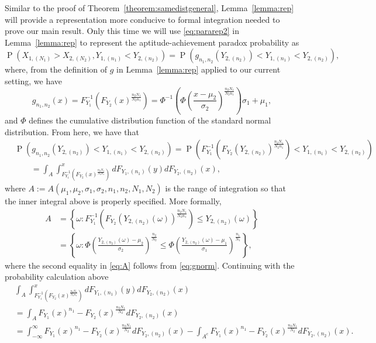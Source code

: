 \documentclass[12pt]{article}
\DeclareMathOperator*{\Prob}{P}
\begin{document}
Similar to the proof of Theorem~\ref{theorem:samedistgeneral}, Lemma~\ref{lemma:rep} will provide a representation more conducive to formal integration needed to prove our main result. Only this time we will use \eqref{eq:pararep2} in Lemma~\ref{lemma:rep} to represent the aptitude-achievement paradox probability as 
$$
 \Prob\left(X_{1,(N_1)} > X_{2,(N_2)}, Y_{1,(n_1)} < Y_{2,(n_2)}\right) = \Prob\left( g_{n_1,n_2}\left(Y_{2,(n_2)}\right) < Y_{1,(n_1)}  < Y_{2,(n_2)}\right),
$$
where, from the definition of $g$ in Lemma~\ref{lemma:rep} applied to our current setting, we have 
\begin{equation} \label{eq:gnorm}
	  g_{n_1, n_2}(x) = F_{Y_1}^{-1}\left(F_{Y_2}(x)^{\frac{n_2N_1}{N_2n_1}}\right) = \Phi^{-1}\left(\Phi\left(\frac{x-\mu_2}{\sigma_2}\right)^\frac{n_2N_1}{N_2n_1}\right)\sigma_1 +\mu_1,
\end{equation}
and $\Phi$ defines the cumulative distribution function of the standard normal distribution. From here, we have that
\begin{align*}
	&\Prob\left( g_{n_1,n_2}\left(Y_{2,(n_2)}\right) < Y_{1,(n_1)}  < Y_{2,(n_2)}\right) = \Prob\left( F_{Y_1}^{-1}\left(F_{Y_2}(Y_{2,(n_2)})^{\frac{n_2N_1}{N_2n_1}}\right) < Y_{1,(n_1)}  < Y_{2,(n_2)}\right)\\
	&\qquad= \int_{A} \int_{F_{Y_1}^{-1}\left(F_{Y_2}(x)^{\frac{n_2N_1}{N_2n_1}}\right)}^{x} d F_{Y_1, (n_1)}(y) d F_{Y_2, (n_2)}(x),
\end{align*}
where $A := A(\mu_1,\mu_2,\sigma_1,\sigma_2, n_1,n_2,N_1,N_2)$ is the range of integration so that the inner integral above is properly specified. More formally,
\begin{equation} \label{eq:A}
\begin{split}
	  A &= \left\{\omega: F_{Y_1}^{-1}\left(F_{Y_2}(Y_{2,(n_2)}(\omega))^{\frac{n_2N_1}{N_2n_1}}\right) \leq Y_{2,(n_2)}(\omega)\right\} \\
  &= \left\{\omega: \Phi\left(\frac{Y_{2,(n_2)}(\omega)-\mu_2}{\sigma_2}\right)^{\frac{n_2}{N_2}} \leq \Phi\left(\frac{Y_{2,(n_2)}(\omega) - \mu_1}{\sigma_1}\right)^{\frac{n_1}{N_1}}\right\},
\end{split}	
\end{equation}
where the second equality in \eqref{eq:A} follows from \eqref{eq:gnorm}. Continuing with the probability calculation above
\begin{align} \label{eq:paradecomp}
	&\int_{A} \int_{F_{Y_1}^{-1}\left(F_{Y_2}(x)^{\frac{n_2N_1}{N_2n_1}}\right)}^{x} d F_{Y_1, (n_1)}(y) d F_{Y_2, (n_2)}(x) \nonumber \\
	&= \int_{A} F_{Y_1}(x)^{n_1} - F_{Y_2}(x)^{\frac{n_2N_1}{N_2}}d F_{Y_2, (n_2)}(x) \nonumber \\
	&= \int_{-\infty}^{\infty} F_{Y_1}(x)^{n_1} - F_{Y_2}(x)^{\frac{n_2N_1}{N_2}}d F_{Y_2, (n_2)}(x) - \int_{A^c} F_{Y_1}(x)^{n_1} - F_{Y_2}(x)^{\frac{n_2N_1}{N_2}}d F_{Y_2, (n_2)}(x).		
\end{align}
\end{document}
